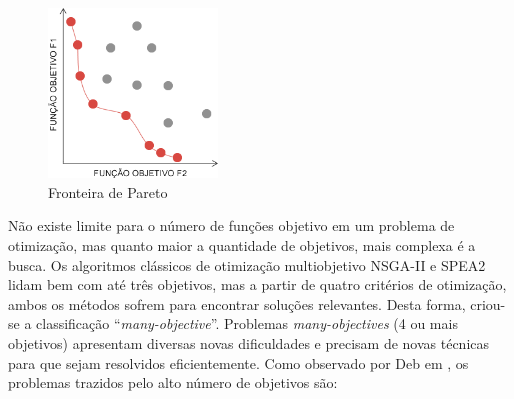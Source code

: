 \begin{figure}
	\label{fig_pareto}
	\caption{Fronteira de Pareto}
	\centering
	\includegraphics[width=0.4\textwidth]{cap_otimizacao-multi/figs/pareto}
\end{figure}

Não existe limite para o número de funções objetivo em um problema de otimização, mas quanto maior a quantidade de objetivos, mais complexa é a busca. Os algoritmos clássicos de otimização multiobjetivo NSGA-II e SPEA2 lidam bem com até três objetivos, mas a partir de quatro critérios de otimização, ambos os métodos sofrem para encontrar soluções relevantes. Desta forma, criou-se a classificação ``\textit{many-objective}''. Problemas \textit{many-objectives} (4 ou mais objetivos) apresentam diversas novas dificuldades e precisam de novas técnicas para que sejam resolvidos eficientemente. Como observado por Deb em \cite{Deb2014}, os problemas trazidos pelo alto número de objetivos são:

